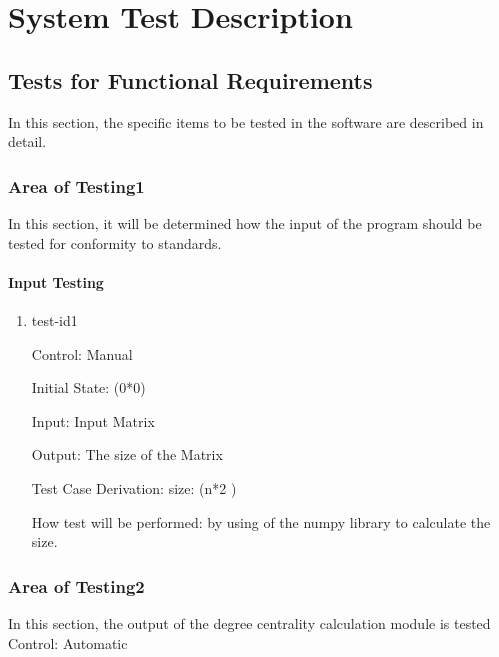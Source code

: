 \documentclass[12pt, titlepage]{article}
\begin{document}
\section{System Test Description}
	
\subsection{Tests for Functional Requirements}
In this section, the specific items to be tested in the software are described in detail.


\subsubsection{Area of Testing1}
In this section, it will be determined how the input of the program should be tested for conformity to standards.
		
\paragraph{Input Testing}

\begin{enumerate}

\item{test-id1\\}

Control: Manual
					
Initial State: (0*0) 
					
Input: Input Matrix
					
Output: The size of the Matrix

Test Case Derivation: size: (n*2 )
					
How test will be performed:  by using of the numpy library to calculate the size.
					

\end{enumerate}

\subsubsection{Area of Testing2}

In this section, the output of the degree centrality calculation module is tested
Control: Automatic
\end{document}
